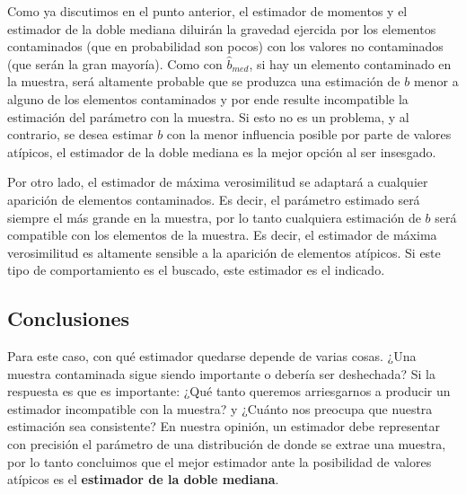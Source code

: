 Como ya discutimos en el punto anterior, el estimador de momentos y el estimador de la doble mediana diluirán la gravedad ejercida por los elementos contaminados (que en probabilidad son pocos) con los valores no contaminados (que serán la gran mayoría). Como con $\hat{b}_{med}$, si hay un elemento contaminado en la muestra, será altamente probable que se produzca una estimación de $b$ menor a alguno de los elementos contaminados y por ende resulte incompatible la estimación del parámetro con la muestra. Si esto no es un problema, y al contrario, se desea estimar $b$ con la menor influencia posible por parte de valores atípicos, el estimador de la doble mediana es la mejor opción al ser insesgado.

\vskip 8pt

Por otro lado, el estimador de máxima verosimilitud se adaptará a cualquier aparición de elementos contaminados. Es decir, el parámetro estimado será siempre el más grande en la muestra, por lo tanto cualquiera estimación de $b$ será compatible con los elementos de la muestra. Es decir, el estimador de máxima verosimilitud es altamente sensible a la aparición de elementos atípicos. Si este tipo de comportamiento es el buscado, este estimador es el indicado.

\subsection{Conclusiones}

Para este caso, con qué estimador quedarse depende de varias cosas. ¿Una muestra contaminada sigue siendo importante o debería ser deshechada? Si la respuesta es que es importante: ¿Qué tanto queremos arriesgarnos a producir un estimador incompatible con la muestra? y ¿Cuánto nos preocupa que nuestra estimación sea consistente? En nuestra opinión, un estimador debe representar con precisión el parámetro de una distribución de donde se extrae una muestra, por lo tanto concluimos que el mejor estimador ante la posibilidad de valores atípicos es el \textbf{estimador de la doble mediana}.